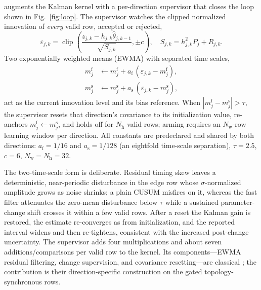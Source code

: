 \TSSRKE{} augments the Kalman kernel with a per-direction supervisor that closes the loop shown in Fig.~\ref{fig:loop}. The supervisor watches the clipped normalized innovation of \emph{every} valid row, accepted or rejected,
\begin{equation}
\varepsilon_{j,k}=\operatorname{clip}\!\left(\frac{z_{j,k}-h_{j,k}\hat\theta_{j,k-1}}{\sqrt{S_{j,k}}},\pm c\right),
\quad S_{j,k}=h_{j,k}^2P_{j}+R_{j,k}.
\label{eq:eps}
\end{equation}
Two exponentially weighted means (EWMA) with separated time scales,
\begin{equation}
\begin{aligned}
m^{\mathrm f}_{j}&\leftarrow m^{\mathrm f}_{j}+a_{\mathrm f}\,(\varepsilon_{j,k}-m^{\mathrm f}_{j}),\\
m^{\mathrm s}_{j}&\leftarrow m^{\mathrm s}_{j}+a_{\mathrm s}\,(\varepsilon_{j,k}-m^{\mathrm s}_{j}),
\end{aligned}
\label{eq:twoscale}
\end{equation}
act as the current innovation level and its bias reference. When $|m^{\mathrm f}_{j}-m^{\mathrm s}_{j}|>\tau$, the supervisor resets that direction's covariance to its initialization value, re-anchors $m^{\mathrm f}_{j}\leftarrow m^{\mathrm s}_{j}$, and holds off for $N_{\mathrm h}$ valid rows; arming requires an $N_{\mathrm w}$-row learning window per direction. All constants are predeclared and shared by both directions: $a_{\mathrm f}=1/16$ and $a_{\mathrm s}=1/128$ (an eightfold time-scale separation), $\tau=2.5$, $c=6$, $N_{\mathrm w}=N_{\mathrm h}=32$.

The two-time-scale form is deliberate. Residual timing skew leaves a deterministic, near-periodic disturbance in the edge row whose $\sigma$-normalized amplitude grows as noise shrinks; a plain CUSUM misfires on it, whereas the fast filter attenuates the zero-mean disturbance below $\tau$ while a sustained parameter-change shift crosses it within a few valid rows. After a reset the Kalman gain is restored, the estimate re-converges as from initialization, and the reported interval widens and then re-tightens, consistent with the increased post-change uncertainty. The supervisor adds four multiplications and about seven additions/comparisons per valid row to the kernel. Its components---EWMA residual filtering, change supervision, and covariance resetting---are classical \cite{page1954cusum,mehra1970adaptive,willsky1976survey,gustafsson2000adaptive}; the contribution is their direction-specific construction on the gated topology-synchronous rows.
